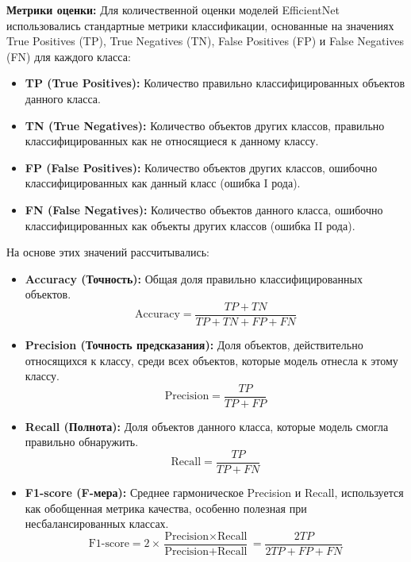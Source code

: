 \documentclass[14pt]{extarticle}
\begin{document}
\textbf{Метрики оценки:} Для количественной оценки моделей EfficientNet использовались стандартные метрики классификации, основанные на значениях True Positives (TP), True Negatives (TN), False Positives (FP) и False Negatives (FN) для каждого класса:
\begin{itemize}
    \item \textbf{TP (True Positives):} Количество правильно классифицированных объектов данного класса.
    \item \textbf{TN (True Negatives):} Количество объектов других классов, правильно классифицированных как не относящиеся к данному классу.
    \item \textbf{FP (False Positives):} Количество объектов других классов, ошибочно классифицированных как данный класс (ошибка I рода).
    \item \textbf{FN (False Negatives):} Количество объектов данного класса, ошибочно классифицированных как объекты других классов (ошибка II рода).
\end{itemize}
На основе этих значений рассчитывались:
\begin{itemize}
    \item \textbf{Accuracy (Точность):} Общая доля правильно классифицированных объектов.
      \begin{equation} \label{eq:accuracy}
      \text{Accuracy} = \frac{TP + TN}{TP + TN + FP + FN}
      \end{equation}
    \item \textbf{Precision (Точность предсказания):} Доля объектов, действительно относящихся к классу, среди всех объектов, которые модель отнесла к этому классу.
      \begin{equation} \label{eq:precision}
      \text{Precision} = \frac{TP}{TP + FP}
      \end{equation}
    \item \textbf{Recall (Полнота):} Доля объектов данного класса, которые модель смогла правильно обнаружить.
      \begin{equation} \label{eq:recall}
      \text{Recall} = \frac{TP}{TP + FN}
      \end{equation}
    \item \textbf{F1-score (F-мера):} Среднее гармоническое Precision и Recall, используется как обобщенная метрика качества, особенно полезная при несбалансированных классах.
      \begin{equation} \label{eq:f1}
      \text{F1-score} = 2 \times \frac{\text{Precision} \times \text{Recall}}{\text{Precision} + \text{Recall}} = \frac{2TP}{2TP + FP + FN}
      \end{equation}
\end{itemize}
\end{document}
